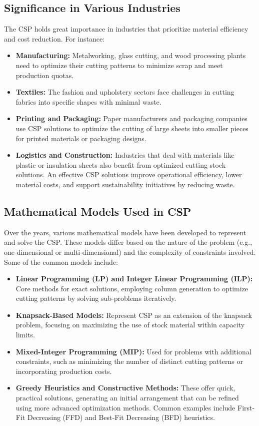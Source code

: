 \documentclass[a4paper]{article}
\begin{document}
\subsection{Significance in Various Industries}
The CSP holds great importance in industries that prioritize material efficiency and cost reduction. For instance:
\begin{itemize}
    \item \textbf{Manufacturing:}  Metalworking, glass cutting, and wood processing plants need to optimize their cutting patterns to minimize scrap and meet production quotas.
    \item \textbf{Textiles:}  The fashion and upholstery sectors face challenges in cutting fabrics into specific shapes with minimal waste.
    \item \textbf{Printing and Packaging:}  Paper manufacturers and packaging companies use CSP solutions to optimize the cutting of large sheets into smaller pieces for printed materials or packaging designs.
    \item \textbf{Logistics and Construction:}  Industries that deal with materials like plastic or insulation sheets also benefit from optimized cutting stock solutions.
An effective CSP solutions improve operational efficiency, lower material costs, and support sustainability initiatives by reducing waste.
\end{itemize}
\subsection{Mathematical Models Used in CSP}
Over the years, various mathematical models have been developed to represent and solve the CSP. These models differ based on the nature of the problem (e.g., one-dimensional or multi-dimensional) and the complexity of constraints involved. Some of the common models include:
\begin{itemize}
    \item \textbf{Linear Programming (LP) and Integer Linear Programming (ILP):}  Core methods for exact solutions, employing column generation to optimize cutting patterns by solving sub-problems iteratively.
    \item \textbf{Knapsack-Based Models:} Represent CSP as an extension of the knapsack problem, focusing on maximizing the use of stock material within capacity limits.
    \item \textbf{Mixed-Integer Programming (MIP):}  Used for problems with additional constraints, such as minimizing the number of distinct cutting patterns or incorporating production costs.
    \item \textbf{Greedy Heuristics and Constructive Methods:}  These offer quick, practical solutions, generating an initial arrangement that can be refined using more advanced optimization methods. Common examples include First-Fit Decreasing (FFD) and Best-Fit Decreasing (BFD) heuristics.
\end{itemize}
\end{document}
